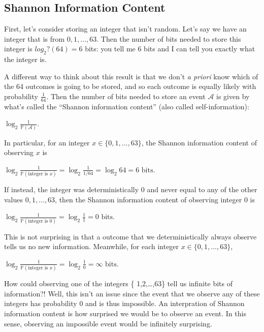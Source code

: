 \documentclass[6008notes.tex]{subfiles}
\begin{document}
\subsection{Shannon Information Content}

First, let's consider storing an integer that isn't random. Let's say we have an integer that is from $0,1,\dots ,63$. Then the number of bits needed to store this integer is $log_2?(64)=6$ bits: you tell me 6 bits and I can tell you exactly what the integer is.

A different way to think about this result is that we don't \textit{a priori} know which of the 64 outcomes is going to be stored, and so each outcome is equally likely with probability $\frac{1}{64}$. Then the number of bits needed to store an event $\mathcal{A}$ is given by what's called the ``Shannon information content'' (also called self-information):

{\centering$\log _{2}\frac{1}{\mathbb {P}(\mathcal{A})}.$ \par}

In particular, for an integer $x\in \{ 0,1,\dots ,63\}$, the Shannon information content of observing $x$ is

{\centering$\log _{2}\frac{1}{\mathbb {P}(\text {integer is }x)}=\log _{2}\frac{1}{1/64}=\log _{2}64=6\text { bits}.$ \par}
 
If instead, the integer was deterministically 0 and never equal to any of the other values $0,1,\dots ,63$, then the Shannon information content of observing integer 0 is

{\centering$\log _{2}\frac{1}{\mathbb {P}(\text {integer is }0)}=\log _{2}\frac{1}{1}=0\text { bits}.$ \par}

This is not surprising in that a outcome that we deterministically always observe tells us no new information. Meanwhile, for each integer $x\in \{ 0,1,\dots ,63\}$,

{\centering$\log _{2}\frac{1}{\mathbb {P}(\text {integer is }x)}=\log _{2}\frac{1}{0}=\infty \text { bits}.$ \par}
 
How could observing one of the integers \{ 1,2,\dots ,63\} tell us infinite bits of information?! Well, this isn't an issue since the event that we observe any of these integers has probability 0 and is thus impossible. An interpration of Shannon information content is how surprised we would be to observe an event. In this sense, observing an impossible event would be infinitely surprising.
\end{document}
